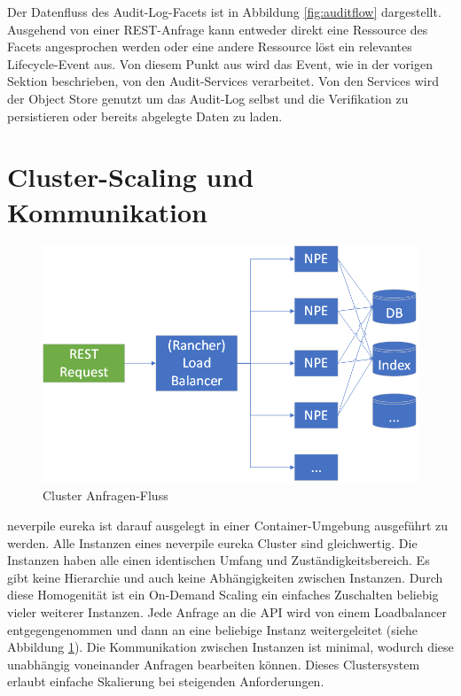 Der Datenfluss des Audit-Log-Facets ist in Abbildung \ref{fig:auditflow} dargestellt. Ausgehend von einer REST-Anfrage kann entweder direkt eine Ressource des Facets angesprochen werden oder eine andere Ressource löst ein relevantes Lifecycle-Event aus. Von diesem Punkt aus wird das Event, wie in der vorigen Sektion beschrieben, von den Audit-Services verarbeitet. Von den Services wird der Object Store genutzt um das Audit-Log selbst und die Verifikation zu persistieren oder bereits abgelegte Daten zu laden.

\section{Cluster-Scaling und Kommunikation}

\begin{figure}[!htb]
	\includegraphics[width=1\textwidth]{content/pictures/instances}
	\caption{Cluster Anfragen-Fluss}
	\label{fig:Instances}
\end{figure}

neverpile eureka ist darauf ausgelegt in einer Container-Umgebung ausgeführt zu werden. Alle Instanzen eines neverpile eureka Cluster sind gleichwertig. Die Instanzen haben alle einen identischen Umfang und Zuständigkeitsbereich. Es gibt keine Hierarchie und auch keine Abhängigkeiten zwischen Instanzen. Durch diese Homogenität ist ein On-Demand Scaling ein einfaches Zuschalten beliebig vieler weiterer Instanzen. Jede Anfrage an die \acs{API} wird von einem Loadbalancer entgegengenommen und dann an eine beliebige Instanz weitergeleitet (siehe Abbildung \ref{fig:Instances}). Die Kommunikation zwischen Instanzen ist minimal, wodurch diese unabhängig voneinander Anfragen bearbeiten können. Dieses Clustersystem erlaubt einfache Skalierung bei steigenden Anforderungen.

